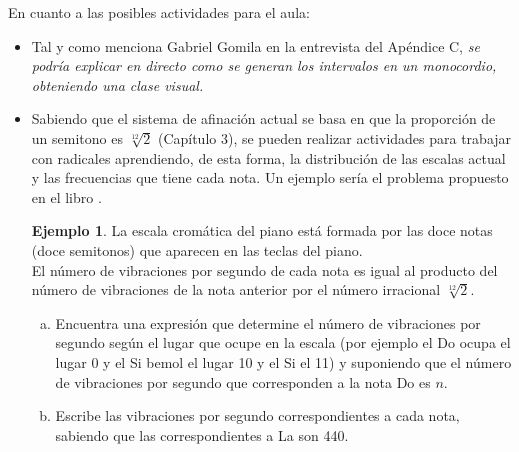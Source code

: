 \documentclass[a4paper, openright, 11pt, titlepage]{report}
\theoremstyle{definition}\newtheorem{defin}[propo]{Definition}
\theoremstyle{definition}\newtheorem{obser}[propo]{Remark}
\theoremstyle{definition}\newtheorem{ejem}[propo]{Ejemplo}
\theoremstyle{definition}\newtheorem{algoritmo}[propo]{Algoritmo}
\begin{document}
En cuanto a las posibles actividades para el aula:
\begin{itemize}
    \item Tal y como menciona Gabriel Gomila en la entrevista del Apéndice C, \textit{se podría explicar en directo como se generan los intervalos en un monocordio, obteniendo una clase visual.}
    \item Sabiendo que el sistema de afinación actual se basa en que la proporción de un semitono es $\sqrt[12]{2}$ (Capítulo 3), se pueden realizar actividades para trabajar con radicales aprendiendo, de esta forma, la distribución de las escalas actual y las frecuencias que tiene cada nota. Un ejemplo sería el problema propuesto en el libro \cite{papa}.\\
    \begin{ejem}
    La escala cromática del piano está formada por las doce notas (doce semitonos) que aparecen en las teclas del piano.\\
    El número de vibraciones por segundo de cada nota es igual al producto del número de vibraciones de la nota anterior por el número irracional $\sqrt[12]{2}$.
    \begin{enumerate}[(a)]
        \item Encuentra una expresión que determine el número de vibraciones por segundo según el lugar que ocupe en la escala (por ejemplo el Do ocupa el lugar 0 y el Si bemol el lugar 10 y el Si el 11) y suponiendo que el número de vibraciones por segundo que corresponden a la nota Do es $n$.
        \item Escribe las vibraciones por segundo correspondientes a cada nota, sabiendo que las correspondientes a La son 440.
    \end{enumerate}
    \end{ejem}
\end{itemize}
\newpage
\appendix
\end{document}
